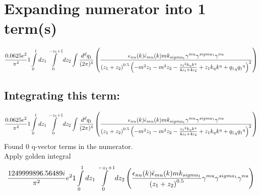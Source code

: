 \section*{Expanding numerator into 1 term(s)}
\begin{dmath}\frac{0.0625 e^{2}}{\pi^{4}}1\int\limits_{ 0 }^{ 1 } d{ z_{ 1 } }\int\limits_{ 0 }^{ - { z_{ 1 } } + 1 } d{ z_{ 2 } }\int\frac{d^d q_1 }{ (2\pi)^4 }\left(\frac{\epsilon_{ \\nu }({ k }) \bar{\epsilon}_{ \\mu }({ k }) m { { k }_{ \\sigma_1 } } { \gamma^{ \\mu } } { \gamma^{ \\sigma_1 } } { \gamma^{ \\nu } }}{\left({ z_{ 1 } } + { z_{ 2 } }\right)^{0.5} \left(- m^{2} { z_{ 1 } } - m^{2} { z_{ 2 } } - \frac{{ z_{ 1 } }^{2} { { k }_{ \eta } } { { k }^{ \eta } }}{4 { z_{ 1 } } + 4 { z_{ 2 } }} + { z_{ 1 } } { { k }_{ \eta } } { { k }^{ \eta } } + { { q_1 }_{ \eta } } { { q_1 }^{ \eta } }\right)^{2}}\right)\end{dmath}
\subsection*{Integrating this term:}
\begin{dmath}\frac{0.0625 e^{2}}{\pi^{4}}1\int\limits_{ 0 }^{ 1 } d{ z_{ 1 } }\int\limits_{ 0 }^{ - { z_{ 1 } } + 1 } d{ z_{ 2 } }\int\frac{d^d q_1 }{ (2\pi)^4 }\left(\frac{\epsilon_{ \\nu }({ k }) \bar{\epsilon}_{ \\mu }({ k }) m { { k }_{ \\sigma_1 } } { \gamma^{ \\mu } } { \gamma^{ \\sigma_1 } } { \gamma^{ \\nu } }}{\left({ z_{ 1 } } + { z_{ 2 } }\right)^{0.5} \left(- m^{2} { z_{ 1 } } - m^{2} { z_{ 2 } } - \frac{{ z_{ 1 } }^{2} { { k }_{ \eta } } { { k }^{ \eta } }}{4 { z_{ 1 } } + 4 { z_{ 2 } }} + { z_{ 1 } } { { k }_{ \eta } } { { k }^{ \eta } } + { { q_1 }_{ \eta } } { { q_1 }^{ \eta } }\right)^{2}}\right)\end{dmath}
Found 0 q-vector terms in the numerator.\\
Apply golden integral
\begin{dmath}\frac{1249999896.56489 i}{\pi^{2}} e^{2}1\int\limits_{ 0 }^{ 1 } d{ z_{ 1 } }\int\limits_{ 0 }^{ - { z_{ 1 } } + 1 } d{ z_{ 2 } }\left(\frac{\epsilon_{ \\nu }({ k }) \bar{\epsilon}_{ \\mu }({ k }) m { { k }_{ \\sigma_1 } }}{\left({ z_{ 1 } } + { z_{ 2 } }\right)^{0.5}} { \gamma^{ \\mu } } { \gamma^{ \\sigma_1 } } { \gamma^{ \\nu } }\right)\end{dmath}
